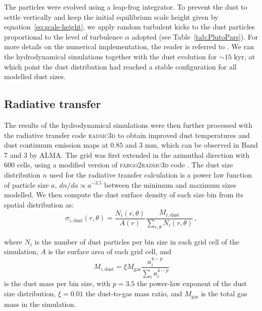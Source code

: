 \documentclass[fleqn,usenatbib]{mnras}
\begin{document}
        The particles were evolved using a leap-frog integrator.
        To prevent the dust to settle vertically and keep the initial equilibrium scale height given by equation~\ref{eq:scale-height}, we apply random turbulent kicks to the dust particles proportional to the level of turbulence $\alpha$ adopted (see Table~\ref{tab:PlutoPars}). For more details on the numerical implementation, the reader is referred to \cite{Picogna2018}. We ran the hydrodynamical simulations together with the dust evolution for $\sim15$ kyr, at which point the dust distribution had reached a stable configuration for all modelled dust sizes.
        
     \subsection{Radiative transfer} \label{sec:radiative transfer}
     
         The results of the hydrodynamical simulations were then further processed with the radiative transfer code \textsc{radmc3d} \citep{radmc3d} to obtain improved dust temperatures and dust continuum emission maps at $0.85$ and $3$ mm, which can be observed in Band 7 and 3 by ALMA. The grid was first extended in the azimuthal direction with 600 cells, using a modified version of \textsc{fargo2radmc3d} code \citep{Baruteau2019}. The dust size distribution $n$ used for the radiative transfer calculation is a power law function of particle size $a$, $dn/da \propto a^{-3.5}$ between the minimum and maximum sizes modelled. We then compute the dust surface density of each size bin from its spatial distribution as:
         \begin{equation}
            \sigma_{i,\mathrm{dust}}(r,\theta) = \frac{N_i(r,\theta)}{A(r)} \frac{M_{i,\mathrm{dust}}}{\sum_{r,\theta}N_i(r,\theta)}\,,
         \end{equation}

         where $N_i$ is the number of dust particles per bin size in each grid cell of the simulation, $A$ is the surface area of each grid cell, and 
         \begin{equation}
            M_{i,\mathrm{dust}} = \xi M_\mathrm{gas} \frac{a_i^{4-p}}{\sum_i a_i^{4-p}}
         \end{equation}
         is the dust mass per bin size, with $p=3.5$ the power-law exponent of the dust size distribution, $\xi=0.01$ the dust-to-gas mass ratio, and $M_\mathrm{gas}$ is the total gas mass in the simulation.
\end{document}
